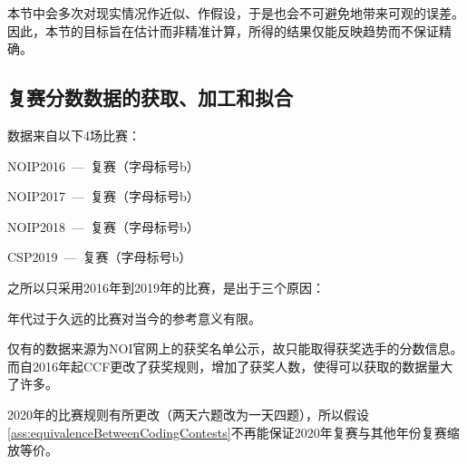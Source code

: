     本节中会多次对现实情况作近似、作假设，于是也会不可避免地带来可观的误差。因此，本节的目标旨在估计而非精准计算，所得的结果仅能反映趋势而不保证精确。

    \subsection{复赛分数数据的获取、加工和拟合}\label{sec:dataPreprocessingOfNOIP}

        数据来自以下4场比赛：
        \begin{asparaitem}
            \item NOIP2016\ ---\ 复赛（字母标号b）
            \item NOIP2017\ ---\ 复赛（字母标号b）
            \item NOIP2018\ ---\ 复赛（字母标号b）
            \item CSP2019\ ---\ 复赛（字母标号b）
        \end{asparaitem}

        \vspace{1.5ex}

        之所以只采用2016年到2019年的比赛，是出于三个原因：
        \begin{asparaitem}
            \item 年代过于久远的比赛对当今的参考意义有限。
            \item 仅有的数据来源为NOI官网上的获奖名单公示，故只能取得获奖选手的分数信息。而自2016年起CCF更改了获奖规则，增加了获奖人数，使得可以获取的数据量大了许多。
            \item 2020年的比赛规则有所更改（两天六题改为一天四题），所以假设\ref{ass:equivalenceBetweenCodingContests}不再能保证2020年复赛与其他年份复赛缩放等价。
        \end{asparaitem}

        \vspace{1.5ex}

        \begin{table}
            \centering
            \caption{4场比赛的相关数据}
            \label{tab:noip16to19}
        \end{table}

